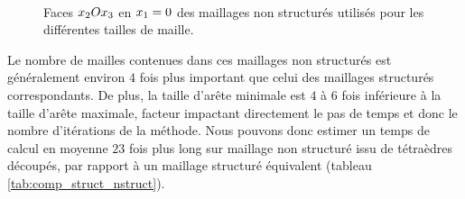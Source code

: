 \begin{figure}[!h]
	\begin{center}
		\caption{
			\label{img:maillages_nstruct}
			Faces $x_2 O x_3$ en $x_1 = 0$
			des maillages non structurés
			utilisés pour les différentes tailles de maille.
		}
		
		\\
	\end{center}
\end{figure}


Le nombre de mailles contenues dans ces maillages non structurés
est généralement environ $4$ fois plus important que celui des maillages structurés correspondants.
De plus, la taille d'arête minimale est $4$ à $6$ fois inférieure
à la taille d'arête maximale, facteur impactant directement le pas de temps
et donc le nombre d'itérations de la méthode.
Nous pouvons donc estimer un temps de calcul en moyenne $23$ fois plus long
sur maillage non structuré issu de tétraèdres découpés,
par rapport à un maillage structuré équivalent
(tableau \ref{tab:comp_struct_nstruct}).


